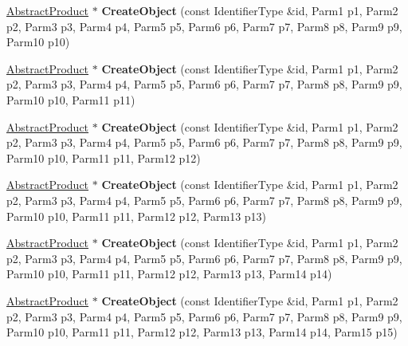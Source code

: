 \begin{DoxyCompactItemize}
\item 
\hypertarget{classLoki_1_1Factory_a13a051cd1c91f174b2fd67ecffe48e6f}{}\hyperlink{classAbstractProduct}{Abstract\+Product} $\ast$ {\bfseries Create\+Object} (const Identifier\+Type \&id, Parm1 p1, Parm2 p2, Parm3 p3, Parm4 p4, Parm5 p5, Parm6 p6, Parm7 p7, Parm8 p8, Parm9 p9, Parm10 p10)\label{classLoki_1_1Factory_a13a051cd1c91f174b2fd67ecffe48e6f}

\item 
\hypertarget{classLoki_1_1Factory_a804b6ca5f12289510544be2e6e0ea371}{}\hyperlink{classAbstractProduct}{Abstract\+Product} $\ast$ {\bfseries Create\+Object} (const Identifier\+Type \&id, Parm1 p1, Parm2 p2, Parm3 p3, Parm4 p4, Parm5 p5, Parm6 p6, Parm7 p7, Parm8 p8, Parm9 p9, Parm10 p10, Parm11 p11)\label{classLoki_1_1Factory_a804b6ca5f12289510544be2e6e0ea371}

\item 
\hypertarget{classLoki_1_1Factory_a9a386099fdc9ae9690cce69764fe4329}{}\hyperlink{classAbstractProduct}{Abstract\+Product} $\ast$ {\bfseries Create\+Object} (const Identifier\+Type \&id, Parm1 p1, Parm2 p2, Parm3 p3, Parm4 p4, Parm5 p5, Parm6 p6, Parm7 p7, Parm8 p8, Parm9 p9, Parm10 p10, Parm11 p11, Parm12 p12)\label{classLoki_1_1Factory_a9a386099fdc9ae9690cce69764fe4329}

\item 
\hypertarget{classLoki_1_1Factory_a7065111062665771b02a070757b2338d}{}\hyperlink{classAbstractProduct}{Abstract\+Product} $\ast$ {\bfseries Create\+Object} (const Identifier\+Type \&id, Parm1 p1, Parm2 p2, Parm3 p3, Parm4 p4, Parm5 p5, Parm6 p6, Parm7 p7, Parm8 p8, Parm9 p9, Parm10 p10, Parm11 p11, Parm12 p12, Parm13 p13)\label{classLoki_1_1Factory_a7065111062665771b02a070757b2338d}

\item 
\hypertarget{classLoki_1_1Factory_afd6883198c22f5a3207def2faf943550}{}\hyperlink{classAbstractProduct}{Abstract\+Product} $\ast$ {\bfseries Create\+Object} (const Identifier\+Type \&id, Parm1 p1, Parm2 p2, Parm3 p3, Parm4 p4, Parm5 p5, Parm6 p6, Parm7 p7, Parm8 p8, Parm9 p9, Parm10 p10, Parm11 p11, Parm12 p12, Parm13 p13, Parm14 p14)\label{classLoki_1_1Factory_afd6883198c22f5a3207def2faf943550}

\item 
\hypertarget{classLoki_1_1Factory_aa4aeb56783c3df08abee540e4eb36abb}{}\hyperlink{classAbstractProduct}{Abstract\+Product} $\ast$ {\bfseries Create\+Object} (const Identifier\+Type \&id, Parm1 p1, Parm2 p2, Parm3 p3, Parm4 p4, Parm5 p5, Parm6 p6, Parm7 p7, Parm8 p8, Parm9 p9, Parm10 p10, Parm11 p11, Parm12 p12, Parm13 p13, Parm14 p14, Parm15 p15)\label{classLoki_1_1Factory_aa4aeb56783c3df08abee540e4eb36abb}

\end{DoxyCompactItemize}


